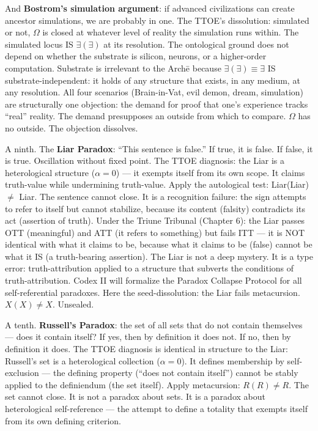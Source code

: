 \documentclass[10pt, openany, oneside]{book}
\begin{document}
And \textbf{Bostrom's simulation argument}: if advanced civilizations can create ancestor simulations, we are probably in one. The TTOE's dissolution: simulated or not, $\Omega$ is closed at whatever level of reality the simulation runs within. The simulated locus IS $\exists(\exists)$ at its resolution. The ontological ground does not depend on whether the substrate is silicon, neurons, or a higher-order computation. Substrate is irrelevant to the Arch\={e} because $\exists(\exists) \equiv \exists$ IS substrate-independent: it holds of any structure that exists, in any medium, at any resolution. All four scenarios (Brain-in-Vat, evil demon, dream, simulation) are structurally one objection: the demand for proof that one's experience tracks ``real'' reality. The demand presupposes an outside from which to compare. $\Omega$ has no outside. The objection dissolves.

A ninth. The \textbf{Liar Paradox}: ``This sentence is false.'' If true, it is false. If false, it is true. Oscillation without fixed point. The TTOE diagnosis: the Liar is a heterological structure ($\alpha = 0$) --- it exempts itself from its own scope. It claims truth-value while undermining truth-value. Apply the autological test: Liar(Liar) $\neq$ Liar. The sentence cannot close. It is a recognition failure: the sign attempts to refer to itself but cannot stabilize, because its content (falsity) contradicts its act (assertion of truth). Under the Triune Tribunal (Chapter 6): the Liar passes OTT (meaningful) and ATT (it refers to something) but fails ITT --- it is NOT identical with what it claims to be, because what it claims to be (false) cannot be what it IS (a truth-bearing assertion). The Liar is not a deep mystery. It is a type error: truth-attribution applied to a structure that subverts the conditions of truth-attribution. Codex II will formalize the Paradox Collapse Protocol for all self-referential paradoxes. Here the seed-dissolution: the Liar fails metacursion. $X(X) \neq X$. Unsealed.

A tenth. \textbf{Russell's Paradox}: the set of all sets that do not contain themselves --- does it contain itself? If yes, then by definition it does not. If no, then by definition it does. The TTOE diagnosis is identical in structure to the Liar: Russell's set is a heterological collection ($\alpha = 0$). It defines membership by self-exclusion --- the defining property (``does not contain itself'') cannot be stably applied to the definiendum (the set itself). Apply metacursion: $R(R) \neq R$. The set cannot close. It is not a paradox about sets. It is a paradox about heterological self-reference --- the attempt to define a totality that exempts itself from its own defining criterion.
\end{document}
